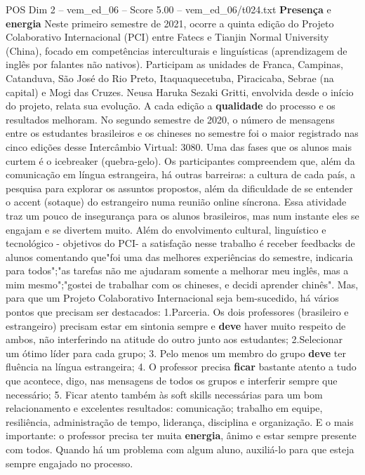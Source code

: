 \begin{textsample}{POS Dim 2 – vem\_ed\_06 – Score 5.00 – vem\_ed\_06/t024.txt}  \label{ex:f2_pos_095}
\textbf{Presença} e \textbf{energia} Neste primeiro semestre de 2021, ocorre a quinta edição do Projeto Colaborativo Internacional (PCI) entre Fatecs e Tianjin Normal University (China), focado em competências interculturais e linguísticas (aprendizagem de inglês por falantes não nativos).
Participam as unidades de Franca, Campinas, Catanduva, São José do Rio Preto, Itaquaquecetuba, Piracicaba, Sebrae (na capital) e Mogi das Cruzes.
Neusa Haruka Sezaki Gritti, envolvida desde o início do projeto, relata sua evolução.
A cada edição a \textbf{qualidade} do processo e os resultados melhoram.
No segundo semestre de 2020, o número de mensagens entre os estudantes brasileiros e os chineses no semestre foi o maior registrado nas cinco edições desse Intercâmbio Virtual: 3080.
Uma das fases que os alunos mais curtem é o icebreaker (quebra-gelo).
Os participantes compreendem que, além da comunicação em língua estrangeira, há outras barreiras: a cultura de cada país, a pesquisa para explorar os assuntos propostos, além da dificuldade de se entender o accent (sotaque) do estrangeiro numa reunião online síncrona.
Essa atividade traz um pouco de insegurança para os alunos brasileiros, mas num instante eles se engajam e se divertem muito.
Além do envolvimento cultural, linguístico e tecnológico - objetivos do PCI- a satisfação nesse trabalho é receber feedbacks de alunos comentando que"foi uma das melhores experiências do semestre, indicaria para todos";"as tarefas não me ajudaram somente a melhorar meu inglês, mas a mim mesmo";"gostei de trabalhar com os chineses, e decidi aprender chinês".
Mas, para que um Projeto Colaborativo Internacional seja bem-sucedido, há vários pontos que precisam ser destacados: 1.Parceria.
Os dois professores (brasileiro e estrangeiro) precisam estar em sintonia sempre e \textbf{deve} haver muito respeito de ambos, não interferindo na atitude do outro junto aos estudantes; 2.Selecionar um ótimo líder para cada grupo; 3.
Pelo menos um membro do grupo \textbf{deve} ter fluência na língua estrangeira; 4.
O professor precisa \textbf{ficar} bastante atento a tudo que acontece, digo, nas mensagens de todos os grupos e interferir sempre que necessário; 5.
Ficar atento também às soft skills necessárias para um bom relacionamento e excelentes resultados: comunicação; trabalho em equipe, resiliência, administração de tempo, liderança, disciplina e organização.
E o mais importante: o professor precisa ter muita \textbf{energia}, ânimo e estar sempre presente com todos.
Quando há um problema com algum aluno, auxiliá-lo para que esteja sempre engajado no processo.

\end{textsample}
